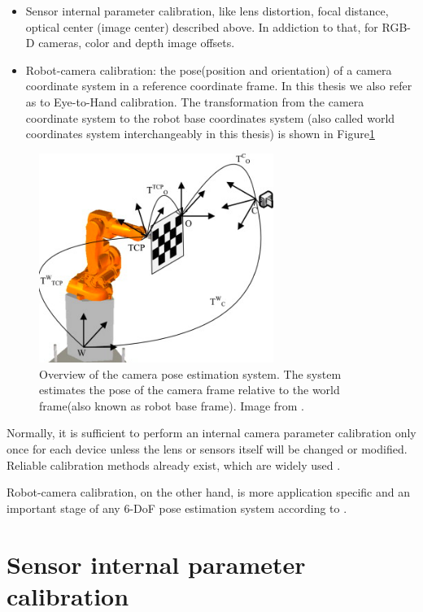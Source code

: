 \begin{itemize}
\item Sensor internal parameter calibration, like lens distortion, focal distance, optical center (image center) described above. In addiction to that, for RGB-D cameras, color and depth image offsets.
\item Robot-camera calibration: the pose(position and orientation) of a camera coordinate system in a reference coordinate frame. In this thesis we also refer as to Eye-to-Hand calibration. The transformation from the camera coordinate system to the robot base coordinates system (also called world coordinates system interchangeably in this thesis) is shown in Figure\ref{fig:system0} 

\end{itemize}
\begin{figure}[!h]
\begin{center}
\includegraphics[width=3in]{figures03/system1.png}
\caption{Overview of the camera pose estimation system. The system estimates  the pose of the camera frame relative to the world frame(also known as robot base frame). Image from \cite{autCAL}.}
\label{fig:system0}
\end{center}
\end{figure}

Normally, it is sufficient to perform an internal camera parameter calibration only once for each device unless the lens or sensors itself will be changed or modified. Reliable calibration methods already exist, which are widely used \cite{Zhang} \cite{Tsai}.

Robot-camera calibration, on the other hand, is more application specific and an important stage of any 6-DoF pose estimation system according to \cite{autCAL1} \cite{autCAL2}. 

\section{Sensor internal parameter calibration}

